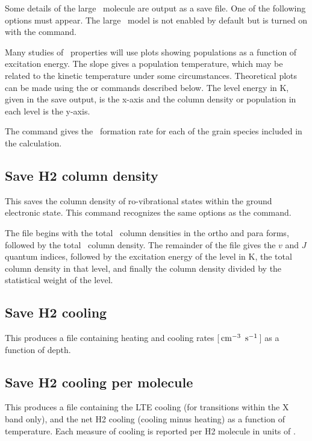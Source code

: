 Some details of the large \htwo\ molecule are output as a save file.  One
of the following options must appear.  The large \htwo\ model is not enabled
by default but is turned on with the  command.

Many studies of \htwo\ properties will use plots showing populations as a
function of excitation energy.  The slope gives a population temperature,
which may be related to the kinetic temperature under some circumstances.
Theoretical plots can be made using the
or  commands described below.
The level energy in K, given in
the save output, is the x-axis and the column density or population in
each level is the y-axis.

The  command gives
the \htwo\ formation rate for each of the grain species included in the calculation.

\subsection{Save H2 column density}

This saves the column density of ro-vibrational states within the ground
electronic state.  This command recognizes the same options as the  command.

The file begins with the total \htwo\ column densities
in the ortho and para forms, followed by the total \htwo\ column density.  The remainder of the file
gives the $v$ and $J$ quantum indices, followed by the excitation energy of
the level in K, the total column density in that level, and finally the
column density divided by the statistical weight of the level.

\subsection{Save H2 cooling}

This produces a file containing heating and cooling rates
[${\rm\thinspace cm^{-3}}\ \mbox{${\rm\thinspace s}^{-1}\,$}$] as a function of depth.

\subsection{Save H2 cooling per molecule}

This produces a file containing the LTE cooling (for transitions within the X band only),
and the net H2 cooling (cooling minus heating) as a function of temperature.
Each measure of cooling is reported per H2 molecule in units of \ergps.

